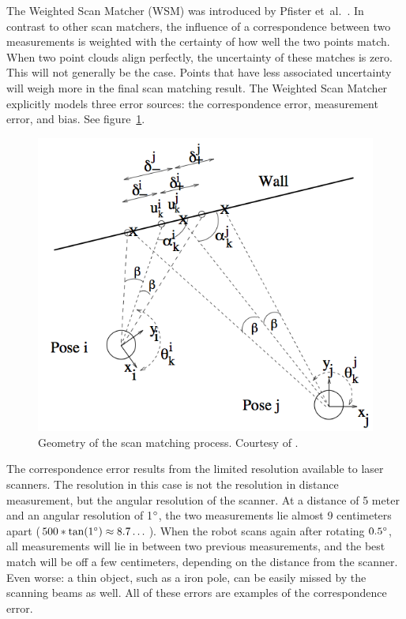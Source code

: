 The Weighted Scan Matcher (WSM) was introduced by Pfister et~al.\ \cite{pfister2002weighted}. In contrast to other scan matchers, the influence of a correspondence between two measurements is weighted with the certainty of how well the two points match. When two point clouds align perfectly, the uncertainty of these matches is zero. This will not generally be the case. Points that have less associated uncertainty will weigh more in the final scan matching result. The Weighted Scan Matcher explicitly models three error sources: the correspondence error, measurement error, and bias. See figure~\ref{fig:pfister2002}. 

\begin{figure}[ht]
  \begin{center}
    \includegraphics[scale=0.3]{images/slam/pfister2002.png}
  \end{center}
  \caption{Geometry of the scan matching process. Courtesy of \cite{pfister2002weighted}.}
  \label{fig:pfister2002}
\end{figure}

The correspondence error results from the limited resolution available to laser scanners. The resolution in this case is not the resolution in distance measurement, but the angular resolution of the scanner. At a distance of 5 meter and an angular resolution of 1$\degree$, the two measurements lie almost 9 centimeters apart ($500 * \tan(1\degree) \approx 8.7\dots$). When the robot scans again after rotating $0.5\degree$, all measurements will lie in between two previous measurements, and the best match will be off a few centimeters, depending on the distance from the scanner. Even worse: a thin object, such as a iron pole, can be easily missed by the scanning beams as well. All of these errors are examples of the correspondence error.

